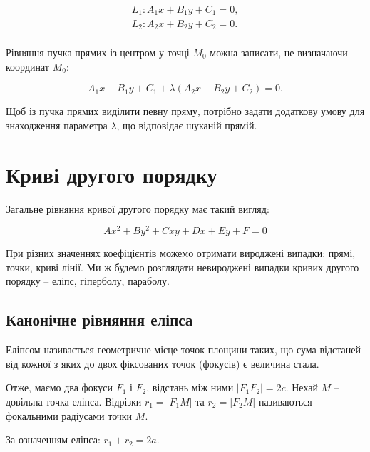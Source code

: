 $$\begin{array}{l}
	L_1: A_1x + B_1y + C_1 = 0,\\
	L_2: A_2x + B_2y + C_2 = 0.\\
\end{array}$$

Рівняння пучка прямих із центром у точці $M_0$ можна записати, не визначаючи
координат $M_0$:

$$A_1x + B_1y + C_1 + \lambda(A_2x + B_2y + C_2) = 0.$$

Щоб із пучка прямих виділити певну пряму, потрібно задати додаткову умову
для знаходження параметра $\lambda$, що відповідає шуканій прямій. 

\section{Криві другого порядку}

Загальне рівняння кривої другого порядку має такий вигляд:

$$Ax^2 + By^2 + Cxy + Dx + Ey + F = 0$$

При різних значеннях коефіцієнтів можемо отримати вироджені випадки:
прямі, точки, криві лінії. Ми ж будемо розглядати невироджені випадки кривих
другого порядку – еліпс, гіперболу, параболу. 

\subsection{Канонічне рівняння еліпса}

\begin{definition}[Еліпс]
	Еліпсом називається геометричне місце точок площини таких, що сума
	відстаней від кожної з яких до двох фіксованих точок (фокусів) є величина стала. 
\end{definition}

\noindent\parbox{4cm}{}
\parbox{\textwidth - 4.1cm}{
	Отже, маємо два фокуси $F_1$ і $F_2$, відстань між ними $|F_1F_2| = 2c$. Нехай $M$ – довільна точка
	еліпса. Відрізки $r_1 = |F_1M|$ та $r_2 = |F_2M|$
	називаються фокальними радіусами точки $M$.

	За означенням еліпса: $r_1 + r_2 = 2a$.
}

